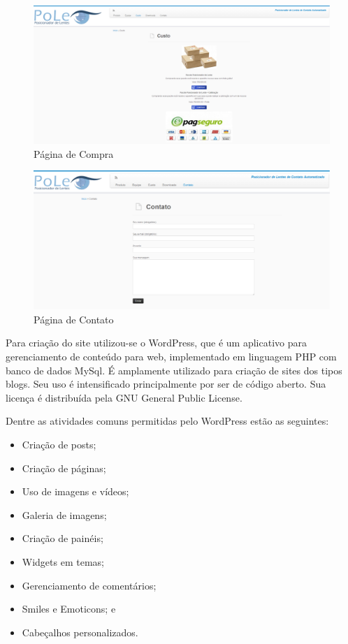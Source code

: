 \begin{figure}[H]
		\centering
			\includegraphics[scale=0.3]{figuras/site2.png}
		\caption{Página de Compra}
		\label{site2}
\end{figure}


\begin{figure}[H]
		\centering
			\includegraphics[scale=0.3]{figuras/site3.png}
		\caption{Página de Contato}
		\label{site3}
\end{figure}


Para criação do site utilizou-se o WordPress, que é um aplicativo para gerenciamento de conteúdo para web, implementado em linguagem PHP com banco de dados MySql. É amplamente utilizado para criação de sites dos tipos blogs. Seu uso é intensificado principalmente por ser de código aberto. Sua licença é distribuída pela GNU General Public License.
	
Dentre as atividades comuns permitidas pelo WordPress estão as seguintes:
 
\begin{itemize}
\item Criação de posts;
\item Criação de páginas;
\item Uso de imagens e vídeos;
\item Galeria de imagens;
\item Criação de painéis;
\item Widgets em temas;
\item Gerenciamento de comentários;
\item Smiles e Emoticons; e
\item Cabeçalhos personalizados.
\end{itemize} 

